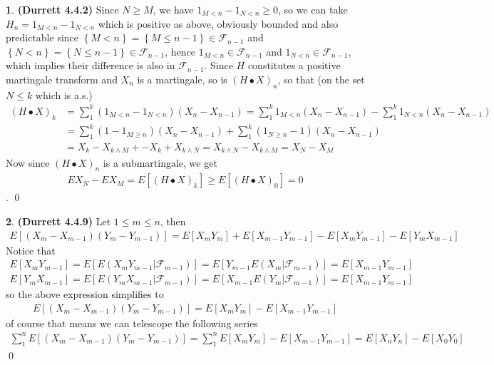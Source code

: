 \documentclass{article}
\theoremstyle{definition}
\newtheorem{pb}{}
\newcommand{\set}[1]{\left\{#1\right\}}
\begin{document}
    \begin{pb}\textbf{(Durrett 4.4.2)}
        Since \(N\geq M\), we have \(1_{M < n} - 1_{N < n} \geq 0\), so we can take \(H_n = 1_{M < n} - 1_{N < n}\) which is positive as above, obviously bounded and also predictable since \(\set{M < n} = \set{M \leq n-1} \in \mathcal{F}_{n-1}\) and \(\set{N < n} = \set{N \leq n-1} \in \mathcal{F}_{n-1}\), hence \(1_{M < n} \in \mathcal{F}_{n-1}\) and \(1_{N < n} \in \mathcal{F}_{n-1}\), which implies their difference is also in \(\mathcal{F}_{n-1}\). Since \(H\) constitutes a positive martingale transform and \(X_n\) is a martingale, so is \((H\bullet X)_n\), so that (on the set \(N \leq k\) which is a.s.)
        \begin{align*}
            (H\bullet X)_k &= \sum_1^k (1_{M < n} - 1_{N < n})(X_n - X_{n-1}) = \sum_1^k 1_{M < n}(X_n - X_{n-1}) - \sum_1^k 1_{N < n}(X_n - X_{n-1}) \\
            &= \sum_1^k (1 - 1_{M \geq n})(X_n - X_{n-1}) + \sum_1^k (1_{N \geq n} - 1)(X_n - X_{n-1}) \\
            &= X_k - X_{k \wedge M} + - X_k + X_{k \wedge N} = X_{k \wedge N} - X_{k \wedge M} = X_N - X_M
        \end{align*}
        Now since \((H\bullet X)_n\) is a submartingale, we get
        \begin{align*}
            EX_N - EX_M = E[(H\bullet X)_k] \geq E[(H\bullet X)_0] = 0
        \end{align*}. \qed
    \end{pb}
    \begin{pb}\textbf{(Durrett 4.4.9)}
        Let \(1 \leq m \leq n\), then
        \begin{align*}
            E[(X_m - X_{m-1})(Y_m-Y_{m-1})] = E[X_mY_m] + E[X_{m-1}Y_{m-1}] - E[X_mY_{m-1}] - E[Y_mX_{m-1}]
        \end{align*}
        Notice that
        \begin{align*}
            E[X_mY_{m-1}] = E[E(X_mY_{m-1}|\mathcal{F}_{m-1})] = E[Y_{m-1}E(X_m|\mathcal{F}_{m-1})] = E[X_{m-1}Y_{m-1}] \\
            E[Y_mX_{m-1}] = E[E(Y_mX_{m-1}|\mathcal{F}_{m-1})] = E[X_{m-1}E(Y_m|\mathcal{F}_{m-1})] = E[X_{m-1}Y_{m-1}]
        \end{align*}
        so the above expression simplifies to
        \begin{align*}
            E[(X_m - X_{m-1})(Y_m-Y_{m-1})] = E[X_mY_m] - E[X_{m-1}Y_{m-1}]
        \end{align*}
        of course that means we can telescope the following series
        \begin{align*}
            \sum_1^n E[(X_m - X_{m-1})(Y_m-Y_{m-1})] = \sum_1^n E[X_mY_m] - E[X_{m-1}Y_{m-1}] = E[X_nY_n] - E[X_0Y_0] 
        \end{align*} \qed
    \end{pb}
\end{document}
